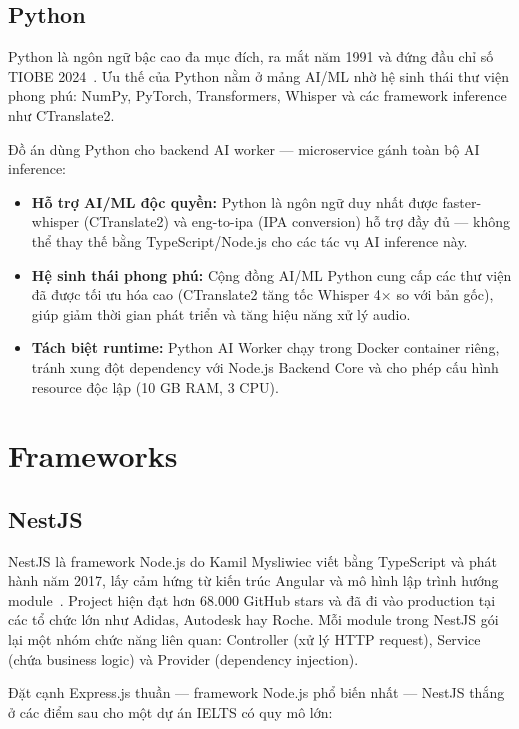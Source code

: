 \subsection{Python}

Python là ngôn ngữ bậc cao đa mục đích, ra mắt năm 1991 và đứng đầu chỉ số TIOBE 2024~\cite{python-docs}. Ưu thế của Python nằm ở mảng AI/ML nhờ hệ sinh thái thư viện phong phú: NumPy, PyTorch, Transformers, Whisper và các framework inference như CTranslate2.

Đồ án dùng Python cho backend AI worker --- microservice gánh toàn bộ AI inference:

\begin{itemize}
    \item \textbf{Hỗ trợ AI/ML độc quyền:} Python là ngôn ngữ duy nhất được faster-whisper (CTranslate2) và eng-to-ipa (IPA conversion) hỗ trợ đầy đủ --- không thể thay thế bằng TypeScript\slash Node.js cho các tác vụ AI inference này.
    \item \textbf{Hệ sinh thái phong phú:} Cộng đồng AI/ML Python cung cấp các thư viện đã được tối ưu hóa cao (CTranslate2 tăng tốc Whisper 4× so với bản gốc), giúp giảm thời gian phát triển và tăng hiệu năng xử lý audio.
    \item \textbf{Tách biệt runtime:} Python AI Worker chạy trong Docker container riêng, tránh xung đột dependency với Node.js Backend Core và cho phép cấu hình resource độc lập (10 GB RAM, 3 CPU).
\end{itemize}

\section{Frameworks}

\subsection{NestJS}

NestJS là framework Node.js do Kamil Mysliwiec viết bằng TypeScript và phát hành năm 2017, lấy cảm hứng từ kiến trúc Angular và mô hình lập trình hướng module~\cite{nestjs-docs}. Project hiện đạt hơn 68.000 GitHub stars và đã đi vào production tại các tổ chức lớn như Adidas, Autodesk hay Roche. Mỗi module trong NestJS gói lại một nhóm chức năng liên quan: Controller (xử lý HTTP request), Service (chứa business logic) và Provider (dependency injection).

Đặt cạnh Express.js thuần --- framework Node.js phổ biến nhất --- NestJS thắng ở các điểm sau cho một dự án IELTS có quy mô lớn:

